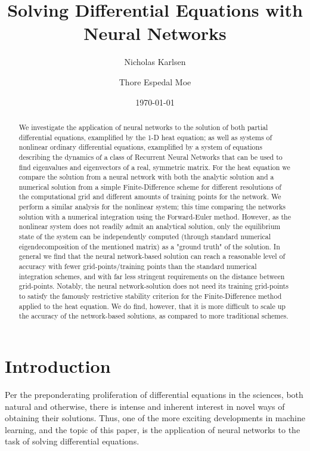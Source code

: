 \documentclass[reprint, english, nofootinbib]{revtex4-2}
\begin{document}
\title{Solving Differential Equations with Neural Networks}
\author{Nicholas Karlsen}
\author{Thore Espedal Moe}
\date{\today}

\begin{abstract}
    We investigate the application of neural networks to the solution of both partial differential equations, examplified by the 1-D heat equation; as well as systems of nonlinear ordinary differential equations, examplified by a system of equations describing the dynamics of a class of Recurrent Neural Networks that can be used to find eigenvalues and eigenvectors of a real, symmetric matrix. For the heat equation we compare the solution from a neural network with both the analytic solution and a numerical solution from a simple Finite-Difference scheme for different resolutions of the computational grid and different amounts of training points for the network. We perform a similar analysis for the nonlinear system; this time comparing the networks solution with a numerical integration using the Forward-Euler method. However, as the nonlinear system does not readily admit an analytical solution, only the equilibrium state of the system can be independently computed (through standard numerical eigendecomposition of the mentioned matrix) as a "ground truth" of the solution. In general we find that the neural network-based solution can reach a reasonable level of accuracy with fewer grid-points/training points than the standard numerical integration schemes, and with far less stringent requirements on the distance between grid-points. Notably, the neural network-solution does not need its training grid-points to satisfy the famously restrictive stability criterion for the Finite-Difference method applied to the heat equation. We do find, however, that it is more difficult to scale up the accuracy of the network-based solutions, as compared to more traditional schemes.
\end{abstract}

\maketitle

\section{Introduction}

Per the preponderating proliferation of differential equations in the sciences, both natural and otherwise, there is intense and inherent interest in novel ways of obtaining their solutions. Thus, one of the more exciting developments in machine learning, and the topic of this paper, is the application of neural networks to the task of solving differential equations. 
\end{document}
